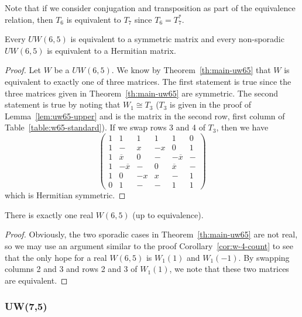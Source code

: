  Note that if we consider conjugation and transposition as part of the equivalence relation, then $T_6$ is equivalent to $T_7$ since $T_6 = T_7^*$.

\begin{proposition} \label{prop:uw65-hermitian}
 Every $UW(6,5)$ is equivalent to a symmetric matrix and every non-sporadic $UW(6,5)$ is equivalent to a Hermitian matrix.

 \begin{proof}
  Let $W$ be a $UW(6,5)$. We know by Theorem~\ref{th:main-uw65} that $W$ is equivalent to exactly one of three matrices. The first statement is true since the three matrices given in Theorem~\ref{th:main-uw65} are symmetric. The second statement is true by noting that $W_1 \cong T_3$ ($T_3$ is given in the proof of Lemma~\ref{lem:uw65-upper} and is the matrix in the second row, first column of Table~\ref{table:w65-standard}). If we swap rows 3 and 4 of $T_3$, then we have
   $$\left(\begin{array}{rrrrrr}
             1 &  1       & 1 &  1 &         1 & 0 \\
             1 &  -       & x & -x &         0 & 1 \\
             1 & \overline{x}  & 0 &  - &  -\overline{x} & - \\
             1 & -\overline{x} & - &  0 &   \overline{x} & - \\
             1 &        0 & -x & x &         - & 1 \\
             0 &        1 &  - & - &         1 & 1
            \end{array}\right)$$ which is Hermitian symmetric.
 \end{proof}

\end{proposition}

\begin{lemma} \label{lem:w65}
 There is exactly one real $W(6,5)$ (up to equivalence).
 \begin{proof}
  Obviously, the two sporadic cases in Theorem~\ref{th:main-uw65} are not real, so we may use an argument similar to the proof Corollary~\ref{cor:w-4-count} to see that the only hope for a real $W(6,5)$ is $W_1(1)$ and $W_1(-1)$. By swapping columns 2 and 3 and rows 2 and 3 of $W_1(1)$, we note that these two matrices are equivalent.
 \end{proof}

\end{lemma}


\subsubsection{UW(7,5)}

